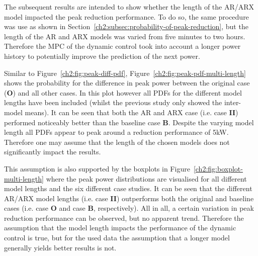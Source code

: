 The subsequent results are intended to show whether the length of the AR/ARX model impacted the peak reduction performance.
To do so, the same procedure was use as shown in Section~\ref{ch2:subsec:probability-of-peak-reduction}, but the length of the AR and ARX models was varied from five minutes to two hours.
Therefore the MPC of the dynamic control took into account a longer power history to potentially improve the prediction of the next power.



Similar to Figure~\ref{ch2:fig:peak-diff-pdf}, Figure~\ref{ch2:fig:peak-pdf-multi-length} shows the probability for the difference in peak power between the original case (\textbf{O}) and all other cases.
In this plot however all PDFs for the different model lengths have been included (whilst the previous study only showed the inter-model means).
It can be seen that both the AR and ARX case (i.e. case \textbf{II}) performed noticeably better than the baseline case \textbf{B}.
Despite the varying model length all PDFs appear to peak around a reduction performance of 5kW.
Therefore one may assume that the length of the chosen models does not significantly impact the results.



This assumption is also supported by the boxplots in Figure~\ref{ch2:fig:boxplot-multi-length} where the peak power distributions are visualised for all different model lengths and the six different case studies.
It can be seen that the different AR/ARX model lengths (i.e. case \textbf{II}) outperforms both the original and baseline cases (i.e. case \textbf{O} and case \textbf{B}, respectively).
All in all, a certain variation in peak reduction performance can be observed, but no apparent trend.
Therefore the assumption that the model length impacts the performance of the dynamic control is true, but for the used data the assumption that a longer model generally yields better results is not.
